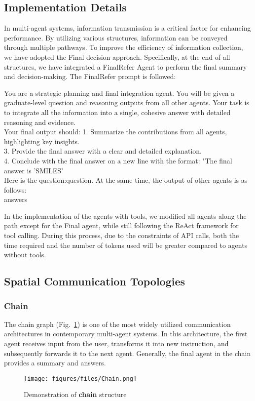 \subsection{Implementation Details}
In multi-agent systems, information transmission is a critical factor for enhancing performance. By utilizing various structures, information can be conveyed through multiple pathways. To improve the efficiency of information collection, we have adopted the Final decision approach. Specifically, at the end of all structures, we have integrated a FinalRefer Agent to perform the final summary and decision-making. The FinalRefer prompt is followed:
\begin{tcolorbox}[colback=gray!10, colframe=black, title=Prompt: FinalRefer]
You are a strategic planning and final integration agent. You will be given a graduate-level question and reasoning outputs from all other agents.
Your task is to integrate all the information into a single, cohesive answer with detailed reasoning and evidence.\\
Your final output should:
1. Summarize the contributions from all agents, highlighting key insights.\\
3. Provide the final answer with a clear and detailed explanation.\\
4. Conclude with the final answer on a new line with the format: "The final answer is 'SMILES'\\
Here is the question:{question}. At the same time, the output of other agents is as follows:\\
{answers}
\end{tcolorbox}

In the implementation of the agents with tools, we modified all agents along the path except for the Final agent, while still following the ReAct framework for tool calling. During this process, due to the constraints of API calls, both the time required and the number of tokens used will be greater compared to agents without tools.
\subsection{Spatial Communication Topologies}
\subsubsection{Chain}
The chain graph (Fig.~\ref{fig:chain}) is one of the most widely utilized communication architectures in contemporary multi-agent systems. In this architecture, the first agent receives input from the user, transforms it into new instruction, and subsequently forwards it to the next agent. Generally, the final agent in the chain provides a summary and answers.
\begin{figure}[!h] 
    \centering
    \texttt{[image: figures/files/Chain.png]}
    \caption{
    Demonstration of \textbf{chain} structure}
    \label{fig:chain}
\end{figure}
